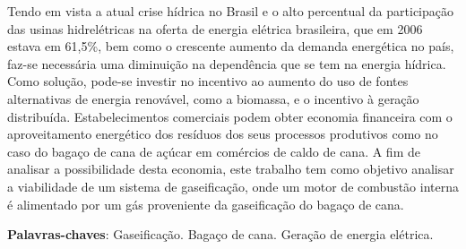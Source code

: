 \begin{resumo}

Tendo em vista a atual crise hídrica no Brasil e o alto percentual da participação das usinas hidrelétricas na oferta de energia elétrica brasileira, que em 2006 estava em 61,5\%, bem como o crescente aumento da demanda energética no país, faz-se necessária uma diminuição na dependência que se tem na energia hídrica. Como solução, pode-se investir no incentivo ao aumento do uso de fontes alternativas de energia renovável, como a biomassa, e o incentivo à geração distribuída. Estabelecimentos comerciais podem obter economia financeira com o aproveitamento energético dos resíduos dos seus processos produtivos como no caso do bagaço de cana de açúcar em comércios de caldo de cana. A fim de analisar a possibilidade desta economia, este trabalho tem como objetivo analisar a viabilidade de um sistema de gaseificação, onde um motor de combustão interna é alimentado por um gás proveniente da gaseificação do bagaço de cana.

 \vspace{\onelineskip}
    
 \noindent
 \textbf{Palavras-chaves}: Gaseificação. Bagaço de cana. Geração de energia elétrica.
\end{resumo}
